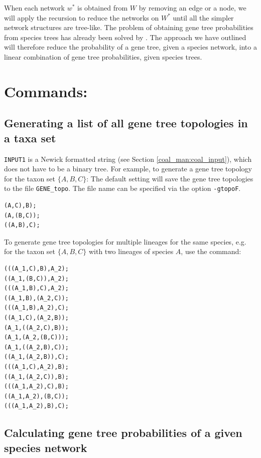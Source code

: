 When each network $w^*$ is obtained from $W$ by removing an edge or a node, we will apply the recursion to reduce the networks on $W^*$ until all the simpler network structures are tree-like. The problem of obtaining gene tree probabilities from species trees has already been solved by \cite{Degnan2005}. The approach we have outlined will therefore reduce the probability of a gene tree, given a species network, into a linear combination of gene tree probabilities, given species trees.


\section{Commands:}
\subsection{Generating a list of all gene tree topologies in a taxa set}
{\tt INPUT1} is a Newick formatted string (see Section \ref{coal_man:coal_input}), which does not have to be a binary tree. For example, to generate a gene tree topology for the taxon set $\{A,B,C\}$:
The default setting will save the gene tree topologies to the file {\tt GENE\_topo}. The file name can be specified via the option {\tt -gtopoF}.
\begin{verbatim}
(A,C),B);
(A,(B,C));
((A,B),C); 
\end{verbatim}

To generate gene tree topologies for multiple lineages for the same species, e.g. for the taxon set $\{A,B,C\}$ with two lineages of species $A$, use the command:
\begin{verbatim}
(((A_1,C),B),A_2);
((A_1,(B,C)),A_2);
(((A_1,B),C),A_2);
((A_1,B),(A_2,C));
(((A_1,B),A_2),C);
((A_1,C),(A_2,B));
(A_1,((A_2,C),B));
(A_1,(A_2,(B,C)));
(A_1,((A_2,B),C));
((A_1,(A_2,B)),C);
(((A_1,C),A_2),B);
((A_1,(A_2,C)),B);
(((A_1,A_2),C),B);
((A_1,A_2),(B,C));
(((A_1,A_2),B),C);
\end{verbatim}

\subsection{Calculating gene tree probabilities of a given species network}

